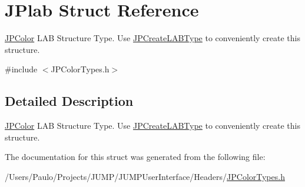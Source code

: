\hypertarget{struct_j_plab}{
\section{JPlab Struct Reference}
\label{struct_j_plab}
}


\hyperlink{interface_j_p_color}{JPColor} LAB Structure Type. Use \hyperlink{_j_p_color_functions_8h_ab10ba17e60d2703b7cd09c7737467062}{JPCreateLABType} to conveniently create this structure.  




{\ttfamily \#include $<$JPColorTypes.h$>$}



\subsection{Detailed Description}
\hyperlink{interface_j_p_color}{JPColor} LAB Structure Type. Use \hyperlink{_j_p_color_functions_8h_ab10ba17e60d2703b7cd09c7737467062}{JPCreateLABType} to conveniently create this structure. 

The documentation for this struct was generated from the following file:\begin{DoxyCompactItemize}
\item 
/Users/Paulo/Projects/JUMP/JUMPUserInterface/Headers/\hyperlink{_j_p_color_types_8h}{JPColorTypes.h}\end{DoxyCompactItemize}

